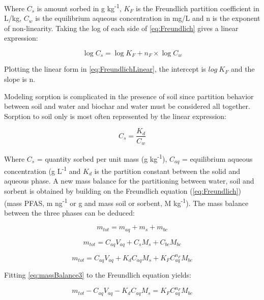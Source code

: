 Where $C_s$ is amount sorbed in \textmu g kg\textsuperscript{-1}, $K_F$ is the Freundlich partition coefficient in L/kg, $C_{w}$ is the equilibrium aqueous concentration in mg/L and n is the exponent of non-linearity. Taking the log of each side of \cref{eq:Freundlich} gives a linear expression:

\begin{equation} \label{eq:FreundlichLinear}
    \log C_s = \log K_F + n_F \times \log C_{w}
\end{equation}

Plotting the linear form in \cref{eq:FreundlichLinear}, the intercept is $log~K_F$ and the slope is n. 

Modeling sorption is complicated in the presence of soil since partition behavior between soil and water and biochar and water must be considered all together. Sorption to soil only is most often represented by the linear expression:

\begin{equation} \label{eq:KD}
    C_s = \frac{K_d}{C_{w}}
\end{equation}

Where $C_s$ = quantity sorbed per unit mass (\textmu g kg\textsuperscript{-1}), $C_{aq}$ =  equilibrium aqueous concentration (\textmu g L\textsuperscript{-1} and $K_d$ is the partition constant between the solid and aqueous phase. A new mass balance for the partitioning between water, soil and sorbent is obtained by building on the Freundlich equation (\cref{eq:Freundlich}) (mass PFAS, m ng\textsuperscript{-1} or \textmu g and mass soil or sorbent, M kg\textsuperscript{-1}). The mass balance between the three phases can be deduced:

\begin{equation} \label{eq:massBalance1}
    m_{tot} = m_{aq} + m_{s} + m_{bc}
\end{equation}

\begin{equation} \label{eq:massBalance2}
     m_{tot} = C_{aq}V_{aq} + C_sM_s + C_{bc}M_{bc}
\end{equation}

\begin{equation} \label{eq:massBalance3}
     m_{tot} = C_{aq}V_{aq} + K_dC_{aq}M_s + K_{F}C_{aq}^{n_F}M_{bc}
\end{equation}
 
Fitting \cref{eq:massBalance3} to the Freundlich equation yields:

\begin{equation} \label{eq:FreundFit}
    m_{tot} - C_{aq}V_{aq} - K_dC_{aq}M_s = K_{F}C_{aq}^{n_F}M_{bc}
\end{equation}

